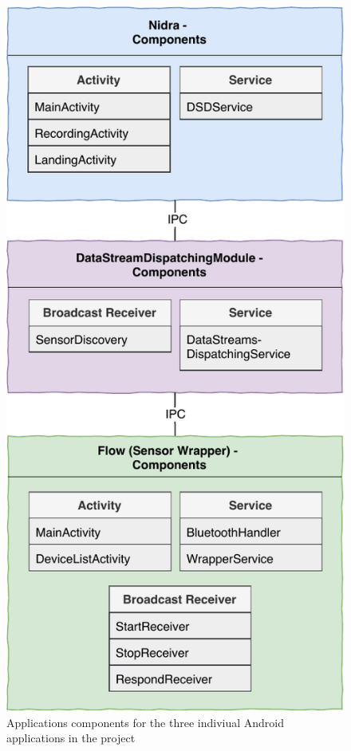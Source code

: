 \begin{figure}
    \centering
    \includegraphics[scale=0.95]{images/Android_Components.pdf}
    \caption{Applications components for the three indiviual Android applications in the project}
    \label{fig:app_components}
\end{figure}


